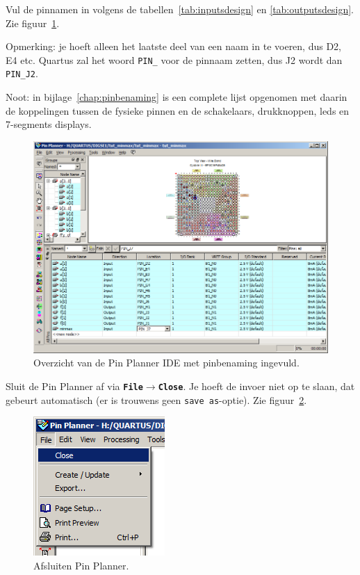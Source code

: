 \documentclass[a4paper,12pt,fleqn,twoside]{book}
\def\tutpicscale{0.455}
\newcommand{\menu}[1]{\texttt{\textbf{#1}}}
\newcommand{\naam}[1]{\texttt{#1}}
\def\pijl{$\rightarrow$}%
\begin{document}
Vul de pinnamen in volgens de tabellen~\ref{tab:inputsdesign} en \ref{tab:outputsdesign}.
Zie figuur~\ref{fig:083pinplannerwithpinsassigned}.

Opmerking: je hoeft alleen het laatste deel van een naam in te voeren, dus D2, E4 etc. Quartus 
zal het woord \naam{PIN\_} voor de pinnaam zetten, dus J2 wordt dan \naam{PIN\_J2}.

Noot: in bijlage~\ref{chap:pinbenaming} is een complete lijst opgenomen met daarin de koppelingen tussen de fysieke 
pinnen en de schakelaars, drukknoppen, leds en 7-segments displays.

\begin{figure}[H]
\centering
\includegraphics[scale=\tutpicscale]{083pinplannerwithpinsassigned.png}
\caption{Overzicht van de Pin Planner IDE met pinbenaming ingevuld.}
\label{fig:083pinplannerwithpinsassigned}
\end{figure}

Sluit de Pin Planner af via \menu{File\pijl{}Close}. Je hoeft de invoer niet op te slaan, dat gebeurt 
automatisch (er is trouwens geen \naam{save as}-optie). Zie figuur~\ref{fig:084closepinplanner}.
 
\begin{figure}[H]
\centering
\includegraphics[scale=\tutpicscale]{084closepinplanner.png}
\caption{Afsluiten Pin Planner.}
\label{fig:084closepinplanner}
\end{figure}
\end{document}
